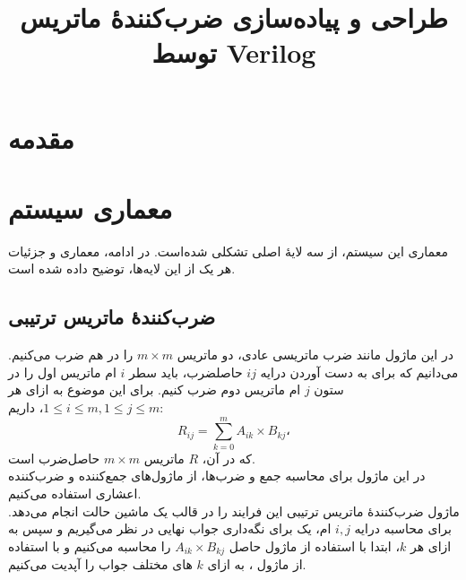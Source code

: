 \documentclass[conference]{IEEEtran-ModifiedForMVIP}
\begin{document}
\IEEEoverridecommandlockouts 

\title{
طراحی و پیاده‌سازی ضرب‌کنندهٔ ماتریس توسط Verilog
}

\author{
}

\maketitle
\begin{abstract}
\end{abstract}
\begin{IEEEkeywords}
\end{IEEEkeywords}


\section{مقدمه}


\section{معماری سیستم}

معماری این سیستم، از سه لایهٔ اصلی تشکلی شده‌است. در ادامه، معماری و جزئیات هر یک از این لایه‌ها، توضیح داده شده است.

\subsection{
    ضرب‌کنندهٔ ماتریس ترتیبی
}

در این ماژول مانند ضرب ماتریسی عادی، دو ماتریس 
$m \times m$
را در هم ضرب می‌کنیم. می‌دانیم که برای به دست آوردن درایه 
$ij$
حاصلضرب، باید سطر $i$ ام ماتریس اول را در ستون $j$ ام ماتریس دوم ضرب کنیم. برای این موضوع به ازای هر 
$1\leq i\leq m , 1\leq j\leq m $،
داریم:
$$R_{ij} = \sum_{k=0}^m{A_{ik} \times B_{kj}}،$$
که در آن،
$R$
ماتریس
$m \times m$
حاصل‌ضرب است.\\
در این ماژول برای محاسبه جمع و ضرب‌ها، از ماژول‌های جمع‌کننده و ضرب‌کننده اعشاری
 استفاده می‌کنیم.\\
ماژول ضرب‌کنندهٔ ماتریس ترتیبی
 این فرایند را در قالب یک ماشین حالت انجام می‌دهد. برای محاسبه درایه $i,j$ ام، یک 
 برای نگه‌داری جواب نهایی در نظر می‌گیریم و سپس
  به ازای هر $k$، ابتدا با استفاده از ماژول 
  حاصل
$A_{ik}\times B_{kj}$
 را محاسبه می‌کنیم و با استفاده از ماژول
 ، به ازای $k$ های مختلف جواب را آپدیت می‌کنیم.
\end{document}
